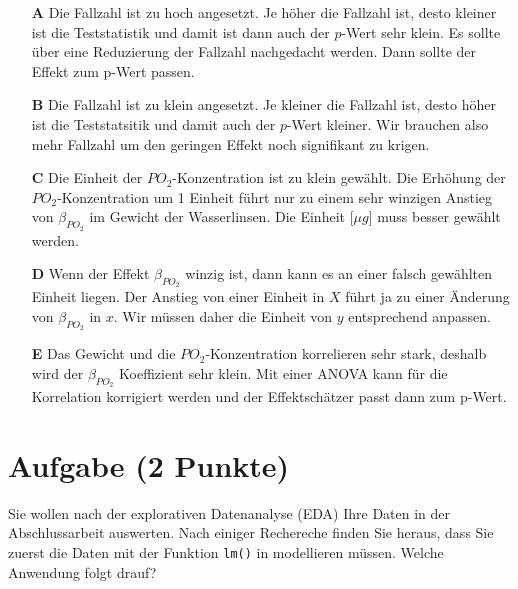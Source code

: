 \documentclass[a4paper, 9pt]{scrartcl}\usepackage[]{graphicx}\usepackage[]{xcolor}
\begin{document}
\begin{enumerate}
\item [\textbf{A} \msquare] Die Fallzahl ist zu hoch angesetzt. Je höher die Fallzahl ist, desto kleiner ist die Teststatistik und damit ist dann auch der $p$-Wert sehr klein. Es sollte über eine Reduzierung der Fallzahl nachgedacht werden. Dann sollte der Effekt zum p-Wert passen.
\item [\textbf{B} \msquare] Die Fallzahl ist zu klein angesetzt. Je kleiner die Fallzahl ist, desto höher ist die Teststatsitik und damit auch der $p$-Wert kleiner. Wir brauchen also mehr Fallzahl um den geringen Effekt noch signifikant zu krigen.
\item [\textbf{C} \msquare] Die Einheit der $PO_2$-Konzentration ist zu klein gewählt. Die Erhöhung der $PO_2$-Konzentration um 1 Einheit führt nur zu einem sehr winzigen Anstieg von $\beta_{PO_2}$ im Gewicht der Wasserlinsen. Die Einheit [$\mu g$] muss besser gewählt werden.
\item [\textbf{D} \msquare] Wenn der Effekt $\beta_{PO_2}$ winzig ist, dann kann es an einer falsch gewählten Einheit liegen. Der Anstieg von einer Einheit in $X$ führt ja zu einer Änderung von $\beta_{PO_2}$ in $x$. Wir müssen daher die Einheit von $y$ entsprechend anpassen.
\item [\textbf{E} \msquare] Das Gewicht und die $PO_2$-Konzentration korrelieren sehr stark, deshalb wird der $\beta_{PO_2}$ Koeffizient sehr klein. Mit einer ANOVA kann für die Korrelation korrigiert werden und der Effektschätzer passt dann zum p-Wert.
\end{enumerate}

\section{Aufgabe \hfill (2 Punkte)}



Sie wollen nach der explorativen Datenanalyse (EDA) Ihre Daten in der Abschlussarbeit auswerten. Nach einiger Rechereche finden Sie heraus, dass Sie zuerst die Daten mit der Funktion \texttt{lm()} in \Rlogo modellieren müssen. Welche Anwendung folgt drauf?
\end{document}
